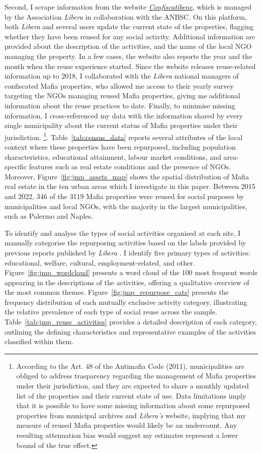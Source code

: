 \documentclass[12pt]{article}
\theoremstyle{plain}
\theoremstyle{plain}
\theoremstyle{plain}
\theoremstyle{definition}
\theoremstyle{plain}
\theoremstyle{definition}
\theoremstyle{plain}
\theoremstyle{remark}
\theoremstyle{definition}
\theoremstyle{definition}
\theoremstyle{plain}
\begin{document}
Second, I scrape information from the website \emph{\href{https://www.confiscatibene.it/}{Confiscatibene}}, which is managed by the Association \emph{Libera} in collaboration with the ANBSC. On this platform, both \emph{Libera} and several users update the current state of the properties, flagging whether they have been reused for any social activity. Additional information are provided about the description of the activities, and the name of the local NGO managing the property. In a few cases, the website also reports the year and the month when the reuse experience started. Since the website releases reuse-related information up to 2018, I collaborated with the \emph{Libera} national managers of confiscated Mafia properties, who allowed me access to their yearly survey targeting the NGOs managing reused Mafia properties, giving me additional information about the reuse practices to date. Finally, to minimise missing information, I cross-referenced my data with the information shared by every single municipality about the current status of Mafia properties under their jurisdiction. \footnote{According to the Art. 48 of the Antimafia Code (2011), municipalities are obliged to address trasparency regarding the management of Mafia properties under their jurisdiction, and they are expected to share a monthly updated list of the properties and their current state of use. Data limitations imply that it is possible to have some missing information about some repurposed properties from municipal archives and \emph{Libera's} website, implying that my measure of reused Mafia properties would likely be an undercount. Any resulting attenuation bias would suggest my estimates represent a lower bound of the true effect.}. Table~\ref{tab:census_data} reports several attributes of the local context where these properties have been repurposed, including population characteristics, educational attainment, labour market conditions, and area-specific features such as real estate conditions and the presence of NGOs. Moreover, Figure~\ref{fig:jmp_assets_map} shows the spatial distribution of Mafia real estate in the ten urban areas which I investigate in this paper. Between 2015 and 2022, 346 of the 3119 Mafia properties were reused for social purposes by municipalities and local NGOs, with the majority in the largest municipalities, such as Palermo and Naples. \par
To identify and analyse the types of social activities organised at each site, I manually categorise the repurposing activities based on the labels provided by previous reports published by \emph{Libera} \citep{falcone_beneitalia_2016}. I identify five primary types of activities: educational, welfare, cultural, employment-related, and other. Figure~\ref{fig:jmp_wordcloud} presents a word cloud of the 100 most frequent words appearing in the descriptions of the activities, offering a qualitative overview of the most common themes. Figure~\ref{fig:jmp_repurpose_cats} presents the frequency distribution of each mutually exclusive activity category, illustrating the relative prevalence of each type of social reuse across the sample. Table~\ref{tab:jmp_reuse_activities} provides a detailed description of each category, outlining the defining characteristics and representative examples of the activities classified within them. 
\end{document}
